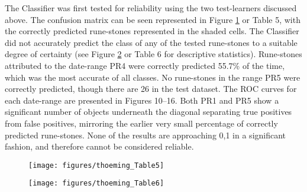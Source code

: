 
The Classifier was first tested for reliability using the two test-learners discussed above. The confusion matrix can be seen represented in Figure \ref{fig:Table5} or Table 5, with the correctly predicted rune-stones represented in the shaded cells. The Classifier did not accurately predict the class of any of the tested rune-stones to a suitable degree of certainty (see Figure \ref{fig:Table6} or Table 6 for descriptive statistics). Rune-stones attributed to the date-range PR4 were correctly predicted 55.7\% of the time, which was the most accurate of all classes. No rune-stones in the range PR5 were correctly predicted, though there are 26 in the test dataset. The ROC curves for each date-range are presented in Figures 10--16. Both PR1 and PR5 show a significant number of objects underneath the diagonal separating true positives from false positives, mirroring the earlier very small percentage of correctly predicted rune-stones. None of the results are approaching 0,1 in a significant fashion, and therefore cannot be considered reliable.

\begin{figure}[!htb]
	\texttt{[image: figures/thoeming\_Table5]}
	\centering
	\label{fig:Table5}
\end{figure}

\begin{figure}[!htb]
	\texttt{[image: figures/thoeming\_Table6]}
	\centering
	\label{fig:Table6}
\end{figure}


